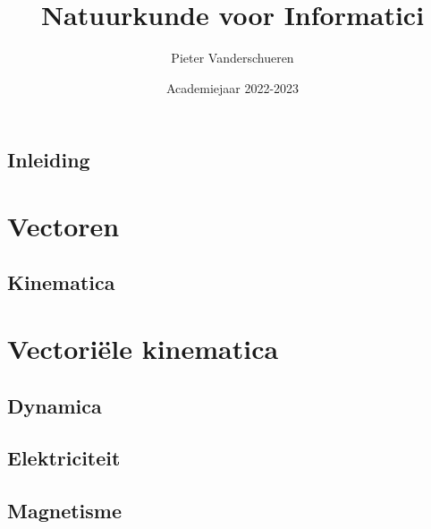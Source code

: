 \documentclass{exam}
\title{Natuurkunde voor Informatici}
\author{Pieter Vanderschueren}
\date{Academiejaar 2022-2023}
\newcommand{\RomanNumeralCaps}[1]{\MakeUppercase{\romannumeral #1}}
\newcommand{\introPage}[1]{

    \vspace*{\fill}
    \begin{center}
        
    \section*{#1}
    \end{center}

    \vspace*{\fill}
}
\begin{document}
\begin{titlingpage}
\maketitle
\end{titlingpage}


\newpage

%
%
%
%
%

\tableofcontents

\newpage

\introPage{Inleiding}

\newpage

\section{Vectoren}

\vspace{0.5cm}



\newpage

\introPage{Kinematica}

\newpage

\section{Vectoriële kinematica}

\vspace{0.5cm}



\newpage

\introPage{Dynamica}

\newpage



\newpage

\introPage{Elektriciteit}

\newpage



\newpage

\introPage{Magnetisme}

\newpage


\end{document}
